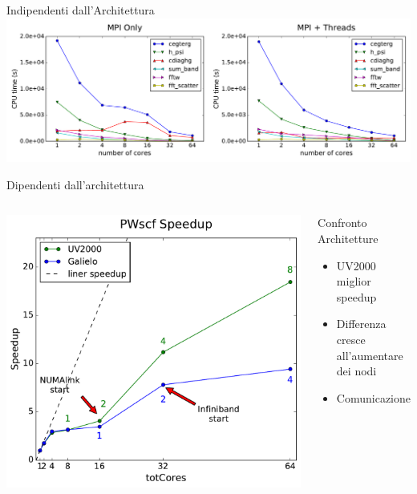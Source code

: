 \documentclass[8pt]{beamer}
\begin{document}
\begin{frame}{Indipendenti dall'Architettura}
	\includegraphics[width=1\textwidth]{threads_comparison.pdf}	
\end{frame}



\begin{frame}{Dipendenti dall'architettura}
\begin{columns}
			\includegraphics[width=1\textwidth]{beam_arch_global.pdf}			
		\begin{block}{Confronto Architetture}
			\begin{itemize}
				\item UV2000 miglior speedup
				\item Differenza cresce all'aumentare dei nodi
				\item Comunicazione	
			\end{itemize}
		\end{block}
\end{columns}
\end{frame}
\end{document}
